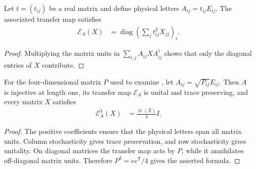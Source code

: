 \begin{lemma}
    \label{thm:fnw_dimension_matrix_unit_transfer}
    \leanok
    Let $t=(t_{ij})$ be a real matrix and define physical letters
    $A_{ij}=t_{ij}E_{ij}$. The associated transfer map satisfies
    \begin{align}
        \mathcal E_A(X)
         & =\operatorname{diag}\left(\sum_j t_{ij}^2X_{jj}\right)_i.
    \end{align}
\end{lemma}
\begin{proof}
    \leanok
    Multiplying the matrix units in $\sum_{i,j}A_{ij}XA_{ij}^{\dagger}$ shows
    that only the diagonal entries of $X$ contribute.
\end{proof}

\begin{lemma}
    \label{thm:fnw_dimension_markov_channel}
    \leanok
    For the four-dimensional matrix $P$ used to examine
    \cite[Section~6, equation~(6.1)]{Nachtergaele1996Spectral}, let
    $A_{ij}=\sqrt{P_{ij}}E_{ij}$. Then $A$ is injective at length one, its transfer
    map $\mathcal E_A$ is unital and trace preserving, and every matrix $X$ satisfies
    \begin{align}
        \mathcal E_A^3(X) & =\frac{\operatorname{tr}(X)}4 I.
    \end{align}
\end{lemma}
\begin{proof}
    \leanok
    The positive coefficients ensure that the physical letters span all matrix
    units. Column stochasticity gives trace preservation, and row stochasticity
    gives unitality. On diagonal matrices the transfer map acts by $P$, while it
    annihilates off-diagonal matrix units. Therefore $P^3=ee^{\mathsf T}/4$ gives
    the asserted formula.
\end{proof}

